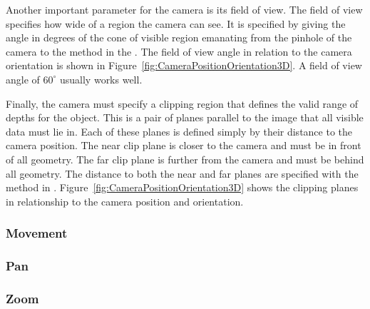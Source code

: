 Another important parameter for the camera is its field of view. The field
of view specifies how wide of a region the camera can see. It is specified
by giving the angle in degrees of the cone of visible region emanating from
the pinhole of the camera to the  method in the
. The field of view angle in relation to the camera
orientation is shown in Figure~\ref{fig:CameraPositionOrientation3D}. A
field of view angle of $60^{\circ}$ usually works well.


Finally, the camera must specify a clipping region that defines the valid
range of depths for the object. This is a pair of planes parallel to the
image that all visible data must lie in. Each of these planes is defined
simply by their distance to the camera position. The near clip plane is
closer to the camera and must be in front of all geometry. The far clip
plane is further from the camera and must be behind all geometry. The
distance to both the near and far planes are specified with the
 method in .
Figure~\ref{fig:CameraPositionOrientation3D} shows the clipping planes in
relationship to the camera position and orientation.


\subsubsection{Movement}


\subsubsection{Pan}




\subsubsection{Zoom}

